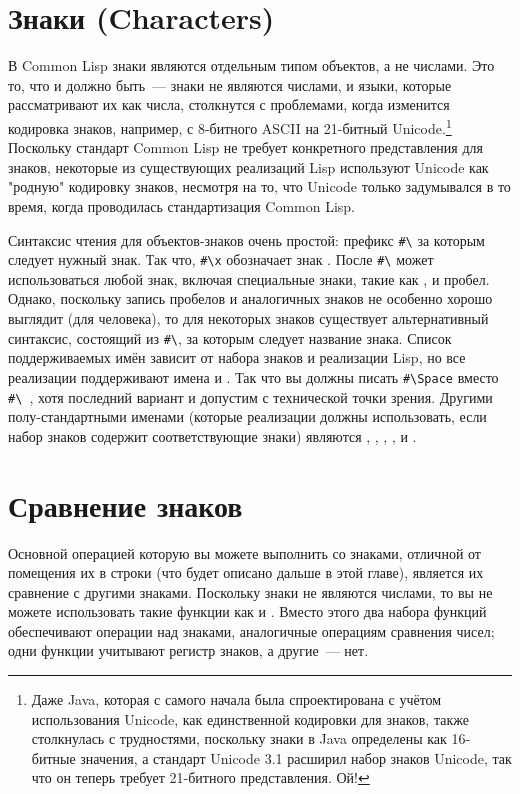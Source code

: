 \section{Знаки (Characters)}

В Common Lisp знаки являются отдельным типом объектов, а не числами.  Это то, что и должно
быть~--- знаки не являются числами, и языки, которые рассматривают их как числа, столкнутся
с проблемами, когда изменится кодировка знаков, например, с 8-битного ASCII на 21-битный
Unicode.\footnote{Даже Java, которая с самого начала была спроектирована с учётом
  использования Unicode, как единственной кодировки для знаков, также столкнулась с
  трудностями, поскольку знаки в Java определены как 16-битные значения, а стандарт
  Unicode 3.1 расширил набор знаков Unicode, так что он теперь требует 21-битного
  представления.  Ой!}  Поскольку стандарт Common Lisp не требует конкретного
представления для знаков, некоторые из существующих реализаций Lisp используют Unicode как
"родную" кодировку знаков, несмотря на то, что Unicode только задумывался в то время,
когда проводилась стандартизация Common Lisp.

Синтаксис чтения для объектов-знаков очень простой: префикс \lstinline!#\! за которым
следует нужный знак.  Так что, \lstinline!#\x! обозначает знак .  После
\lstinline!#\! может использоваться любой знак, включая специальные знаки, такие как
, \code{(} и пробел.  Однако, поскольку запись пробелов и аналогичных знаков не
особенно хорошо выглядит (для человека), то для некоторых знаков существует альтернативный
синтаксис, состоящий из \lstinline!#\!, за которым следует название знака.  Список
поддерживаемых имён зависит от набора знаков и реализации Lisp, но все реализации
поддерживают имена  и .  Так что вы должны писать
\lstinline!#\Space! вместо \lstinline!#\ !, хотя последний вариант и допустим с
технической точки зрения.  Другими полу-стандартными именами (которые реализации должны
использовать, если набор знаков содержит соответствующие знаки) являются ,
, , ,  и .

\section{Сравнение знаков}

Основной операцией которую вы можете выполнить со знаками, отличной от помещения их в
строки (что будет описано дальше в этой главе), является их сравнение с другими знаками.
Поскольку знаки не являются числами, то вы не можете использовать такие функции как
\code{<} и \code{>}.  Вместо этого два набора функций обеспечивают операции над знаками,
аналогичные операциям сравнения чисел; одни функции учитывают регистр знаков, а другие~---
нет.

